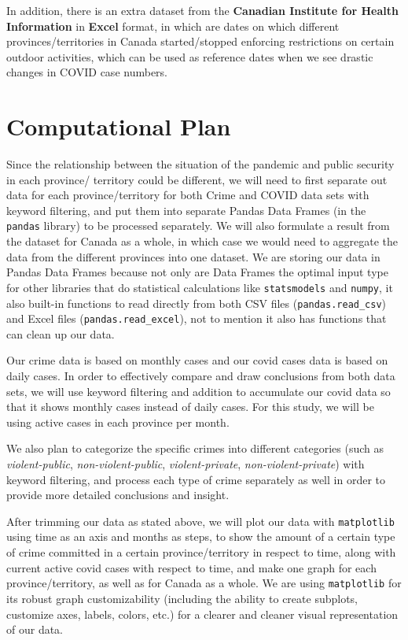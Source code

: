 \documentclass[fontsize=11pt]{article}
\begin{document}
In addition, there is an extra dataset from the \textbf{Canadian Institute for Health Information} in \textbf{Excel} format\cite{intervention}, in which are dates on which different provinces/territories in Canada started/stopped enforcing restrictions on certain outdoor activities, which can be used as reference dates when we see drastic changes in COVID case numbers.
\section{Computational Plan}
Since the relationship between the situation of the pandemic and public security in each province/ territory could be different, we will need to first separate out data for each province/territory for both Crime and COVID data sets with keyword filtering, and put them into separate Pandas Data Frames (in the \verb+pandas+ library) to be processed separately. We will also formulate a result from the dataset for Canada as a whole, in which case we would need to aggregate the data from the different provinces into one dataset. We are storing our data in Pandas Data Frames because not only are Data Frames the optimal input type for other libraries that do statistical calculations like \verb+statsmodels+ and \verb+numpy+, it also built-in functions to read directly from both CSV files (\verb+pandas.read_csv+) and Excel files (\verb+pandas.read_excel+), not to mention it also has functions that can clean up our data.

Our crime data is based on monthly cases and our covid cases data is based on daily cases. In order to effectively compare and draw conclusions from both data sets, we will use keyword filtering and addition to accumulate our covid data so that it shows monthly cases instead of daily cases. For this study, we will be using active cases in each province per month.

We also plan to categorize the specific crimes into different categories (such as \textit{violent-public}, \textit{non-violent-public}, \textit{violent-private}, \textit{non-violent-private}) with keyword filtering, and process each type of crime separately as well in order to provide more detailed conclusions and insight.

After trimming our data as stated above, we will plot our data with \verb+matplotlib+ using time as an axis and months as steps, to show the amount of a certain type of crime committed in a certain province/territory in respect to time, along with current active covid cases with respect to time, and make one graph for each province/territory, as well as for Canada as a whole. We are using \verb+matplotlib+ for its robust graph customizability (including the ability to create subplots, customize axes, labels, colors, etc.) for a clearer and cleaner visual representation of our data.
\end{document}
